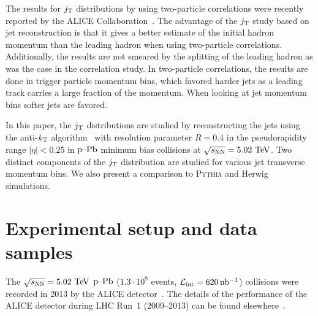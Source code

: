 The results for $j_{\rm T}$ distributions by using two-particle correlations were recently reported by the ALICE Collaboration~\cite{ALICEjt}.
The advantage of the $j_{\rm T}$ study based on jet reconstruction is that it gives a better estimate of the initial hadron momentum than the leading hadron when using two-particle correlations. Additionally, the results are not smeared by the splitting of the leading hadron as was the case in the correlation study. 
In two-particle correlations, the results are done in trigger particle momentum bins, which favored harder jets as a leading track carries a large fraction of the momentum. When looking at jet momentum bins softer jets are favored.

In this paper, the $j_{\rm T}$ distributions are studied by reconstructing the jets using the anti-$k_{\rm T}$ algorithm~\cite{antikt} with resolution parameter $R=0.4$ in the pseudorapidity range $|\eta|<0.25$ in $\mbox{p--Pb}$ minimum bias collisions at $\sqrt{s_{\mathrm{NN}}} = 5.02~\mathrm{TeV}$.
Two distinct components of the $j_{\rm T}$ distribution are studied for various jet transverse momentum bins.
We also present a comparison to \textsc{Pythia} and Herwig simulations.


\section{Experimental setup and data samples}
\label{sec:experimentaldetails}
The $\sqrt{s_{\mathrm{NN}}} = 5.02~\mathrm{TeV}$ $\mbox{p--Pb}$ ($1.3 \cdot 10^{8}$ events, $\mathcal{L}_{\mathrm{int}} = \unit[620]{nb^{-1}}$) collisions were recorded in 2013 by the ALICE detector~\cite{aliceDetector}. The details of the performance of the ALICE detector during LHC Run~1 (2009--2013) can be found elsewhere~\cite{alicePerformance}.

